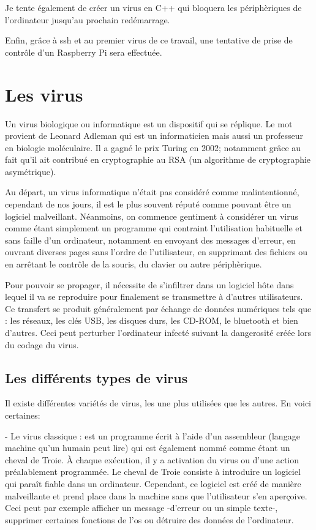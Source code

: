 Je tente également de créer un virus en C++ qui bloquera les périphèriques de l'ordinateur jusqu'au prochain redémarrage. 

Enfin, grâce à ssh et au premier virus de ce travail, une tentative de prise de contrôle d'un Raspberry Pi sera effectuée.
   

\section{Les virus}
	Un virus biologique ou informatique est un dispositif qui se réplique. Le mot provient de Leonard Adleman  qui est un informaticien mais aussi un professeur en biologie moléculaire. Il a gagné le prix Turing en 2002; notamment grâce au fait qu'il ait contribué en cryptographie au RSA (un algorithme de cryptographie asymétrique).

Au départ, un virus informatique n'était pas considéré comme malintentionné, cependant de nos jours, il est le plus souvent réputé comme pouvant être un logiciel malveillant. Néanmoins, on commence gentiment à considérer un virus comme étant simplement un programme qui contraint l'utilisation habituelle et sans faille d'un ordinateur, notamment en envoyant des messages d'erreur, en ouvrant diverses pages sans l'ordre de l'utilisateur, en supprimant des fichiers ou en arrêtant le contrôle de la souris, du clavier ou autre périphèrique. 


Pour pouvoir se propager, il nécessite de s'infiltrer dans un logiciel hôte dans lequel il va se reproduire pour finalement se transmettre à d'autres utilisateurs. Ce transfert se produit généralement par échange de données numériques tels que : les réseaux, les clés USB, les disques durs, les CD-ROM, le bluetooth et bien d'autres. Ceci peut perturber l'ordinateur infecté suivant la dangerosité créée lors du codage du virus.        

\subsection{Les différents types de virus}
	Il existe différentes variétés de virus, les une plus utilisées que les autres. En voici certaines:

- Le virus classique : est un programme écrit à l'aide d'un assembleur (langage machine qu'un humain peut lire) qui est également nommé comme étant un cheval de Troie. À chaque exécution, il y a activation du virus ou d'une action préalablement programmée. Le cheval de Troie  consiste à introduire un logiciel qui paraît fiable dans un ordinateur. Cependant, ce logiciel est créé de manière malveillante et prend place dans la machine sans que l'utilisateur s'en aperçoive. 
Ceci peut par exemple afficher un message -d'erreur ou un simple texte-, supprimer certaines fonctions de l'os ou détruire des données de l'ordinateur.  

